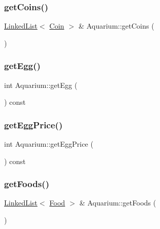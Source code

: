 \subsubsection{\texorpdfstring{get\+Coins()}{getCoins()}}
{\footnotesize\ttfamily \mbox{\hyperlink{class_linked_list}{Linked\+List}}$<$ \mbox{\hyperlink{class_coin}{Coin}} $>$ \& Aquarium\+::get\+Coins (\begin{DoxyParamCaption}{ }\end{DoxyParamCaption})}

\mbox{\label{class_aquarium_afeeff766ee2f6e30127f287e8ff98094}} 
\subsubsection{\texorpdfstring{get\+Egg()}{getEgg()}}
{\footnotesize\ttfamily int Aquarium\+::get\+Egg (\begin{DoxyParamCaption}{ }\end{DoxyParamCaption}) const}

\mbox{\label{class_aquarium_ad35796994738d4b6f2d7ffd5660b52ef}} 
\subsubsection{\texorpdfstring{get\+Egg\+Price()}{getEggPrice()}}
{\footnotesize\ttfamily int Aquarium\+::get\+Egg\+Price (\begin{DoxyParamCaption}{ }\end{DoxyParamCaption}) const}

\mbox{\label{class_aquarium_a919dd5ccffd5fe1469544c74b5f26ee7}} 
\subsubsection{\texorpdfstring{get\+Foods()}{getFoods()}}
{\footnotesize\ttfamily \mbox{\hyperlink{class_linked_list}{Linked\+List}}$<$ \mbox{\hyperlink{class_food}{Food}} $>$ \& Aquarium\+::get\+Foods (\begin{DoxyParamCaption}{ }\end{DoxyParamCaption})}

